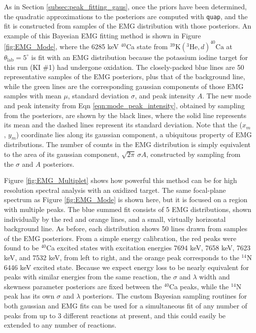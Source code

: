 As in Section \ref{subsec:peak_fitting_gaus}, once the priors have been determined, the quadratic approximations to the posteriors are computed with \texttt{quap}, and the fit is constructed from samples of the EMG distribution with those posteriors. An example of this Bayesian EMG fitting method is shown in Figure \ref{fig:EMG_Mode}, where the 6285 keV $^{40}$Ca state from $^{39}\mathrm{K}(^{3}\mathrm{He},d)^{40}\mathrm{Ca}$ at $\theta_{\mathrm{lab}} = 5^{\circ}$ is fit with an EMG distribution because the potassium iodine target for this run (KI $\#$1) had undergone oxidation. %
The closely-packed blue lines are 50 representative samples of the EMG posteriors, plus that of the background line, while the green lines are the corresponding gaussian components of those EMG samples with mean $\mu$, standard deviation $\sigma$, and peak intensity $A$. The new mode and peak intensity from Eqn \ref{eqn:mode_peak_intensity}, obtained by sampling from the posteriors, are shown by the black lines, where the solid line represents its mean and the dashed lines represent its standard deviation. Note that the ($x_{m}$, $y_{m}$) coordinate lies along its gaussian component, a ubiquitous property of EMG distributions. The number of counts in the EMG distribution is simply equivalent to the area of its gaussian component, $\sqrt{2\pi} \, \sigma A$, constructed by sampling from the $\sigma$ and $A$ posteriors.

Figure \ref{fig:EMG_Multiplet} shows how powerful this method can be for high resolution spectral analysis with an oxidized target. The same focal-plane spectrum as Figure \ref{fig:EMG_Mode} is shown here, but it is focused on a region with multiple peaks. The blue summed fit consists of 5 EMG distributions, shown individually by the red and orange lines, and a small, virtually horizontal background line. As before, each distribution shows 50 lines drawn from samples of the EMG posteriors. From a simple energy calibration, the red peaks were found to be $^{40}$Ca excited states with excitation energies 7694 keV, 7658 keV, 7623 keV, and 7532 keV, from left to right, and the orange peak corresponds to the $^{14}$N 6446 keV excited state. Because we expect energy loss to be nearly equivalent for peaks with similar energies from the same reaction, the $\sigma$ and $\lambda$ width and skewness parameter posteriors are fixed between the $^{40}$Ca peaks, while the $^{14}$N peak has its own $\sigma$ and $\lambda$ posteriors. The custom Bayesian sampling routines for both gaussian and EMG fits can be used for a simultaneous fit of any number of peaks from up to 3 different reactions at present, and this could easily be extended to any number of reactions. %

